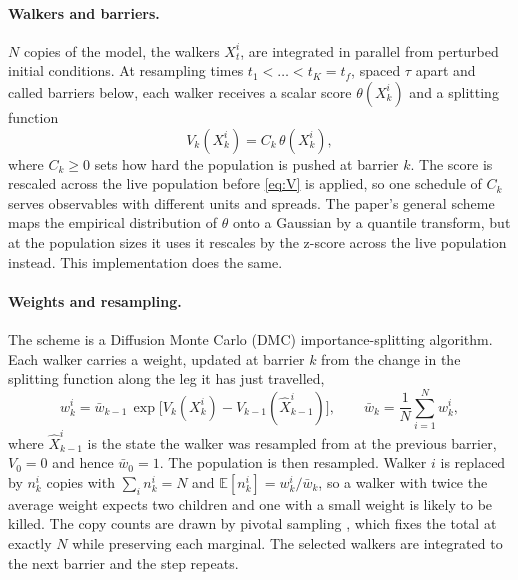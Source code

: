 \documentclass[10pt,twocolumn]{article}
\newcommand{\vk}{V_k}
\newcommand{\ck}{C_k}
\begin{document}
\paragraph{Walkers and barriers.}
$N$ copies of the model, the walkers $X^i_t$, are integrated in parallel from perturbed initial conditions. At resampling times $t_1 < \dots < t_K = t_f$, spaced $\tau$ apart and called barriers below, each walker receives a scalar score $\theta(X^i_k)$ and a splitting function
\begin{equation}
  \vk(X^i_k) = \ck\,\theta(X^i_k),
  \label{eq:V}
\end{equation}
where $\ck \ge 0$ sets how hard the population is pushed at barrier $k$. The score is rescaled across the live population before \cref{eq:V} is applied, so one schedule of $\ck$ serves observables with different units and spreads. The paper's general scheme maps the empirical distribution of $\theta$ onto a Gaussian by a quantile transform, but at the population sizes it uses it rescales by the z-score across the live population instead. This implementation does the same.

\paragraph{Weights and resampling.}
The scheme is a Diffusion Monte Carlo (DMC) importance-splitting algorithm. Each walker carries a weight, updated at barrier $k$ from the change in the splitting function along the leg it has just travelled,
\begin{equation}
  w^i_k = \bar w_{k-1}\,\exp\!\big[\vk(X^i_k) - V_{k-1}(\hat X^i_{k-1})\big],
  \qquad
  \bar w_k = \frac{1}{N}\sum_{i=1}^{N} w^i_k ,
  \label{eq:w}
\end{equation}
where $\hat X^i_{k-1}$ is the state the walker was resampled from at the previous barrier, $V_0 = 0$ and hence $\bar w_0 = 1$. The population is then resampled. Walker $i$ is replaced by $n^i_k$ copies with $\sum_i n^i_k = N$ and $\mathbb{E}[n^i_k] = w^i_k/\bar w_k$, so a walker with twice the average weight expects two children and one with a small weight is likely to be killed. The copy counts are drawn by pivotal sampling \citep{deville1998pivotal}, which fixes the total at exactly $N$ while preserving each marginal. The selected walkers are integrated to the next barrier and the step repeats.
\end{document}
